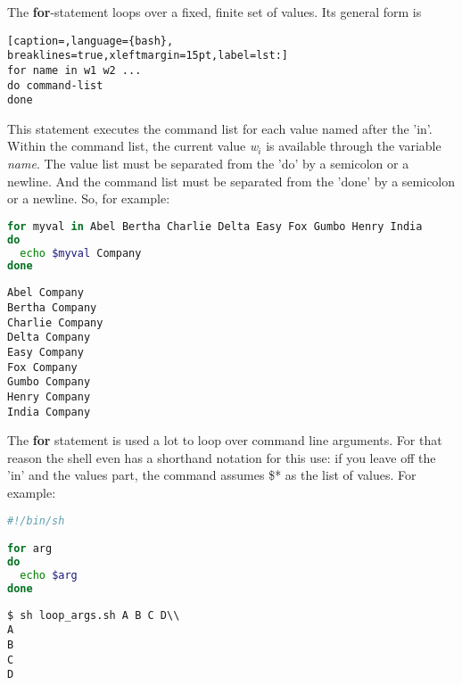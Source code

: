The \textbf{for}-statement loops over a fixed, finite set of values. Its
general form is

\lstset{basicstyle=\scriptsize, numbers=left, captionpos=b, tabsize=4}
\begin{lstlisting}[caption=,language={bash},
breaklines=true,xleftmargin=15pt,label=lst:]
for name in w1 w2 ...
do command-list
done
\end{lstlisting}

This statement executes the command list for each value named after the 'in'.
Within the command list, the current value \emph{w\(_{i}\)} is available
through the variable \emph{name}. The value list must be separated from the
'do' by a semicolon or a newline. And the command list must be separated from
the 'done' by a semicolon or a newline. So, for example:

\lstset{basicstyle=\scriptsize, numbers=left, captionpos=b, tabsize=4}
\begin{lstlisting}[caption=A for loop that prints some values,language={bash},
breaklines=true,xleftmargin=15pt,label=lst:A for loop that prints some values]
for myval in Abel Bertha Charlie Delta Easy Fox Gumbo Henry India
do
  echo $myval Company
done
\end{lstlisting}

\scriptsize
\begin{verbatim}
Abel Company
Bertha Company
Charlie Company
Delta Company
Easy Company
Fox Company
Gumbo Company
Henry Company
India Company
\end{verbatim}
\normalsize

The \textbf{for} statement is used a lot to loop over command line arguments.
For that reason the shell even has a shorthand notation for this use: if you
leave off the 'in' and the values part, the command assumes \$* as the list of
values. For example:
\lstset{basicstyle=\scriptsize, numbers=left, captionpos=b, tabsize=4}
\begin{lstlisting}[caption=Using for to loop over command line arguments,language={bash},
breaklines=true,xleftmargin=15pt,label=lst:Using for to loop over command line arguments]
#!/bin/sh

for arg
do
  echo $arg
done
\end{lstlisting}

\scriptsize
\begin{verbatim}
$ sh loop_args.sh A B C D\\
A
B
C
D
\end{verbatim}
\normalsize

